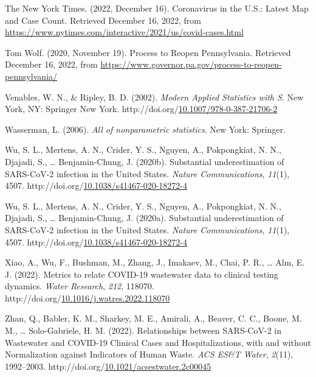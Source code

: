 \documentclass[12pt,twoside]{smiththesis}
\newlength{\cslhangindent}
\newenvironment{CSLReferences}[2] %
 {%
\setlength{\parindent}{0pt}
\ifodd #1 \everypar{\setlength{\hangindent}{\cslhangindent}}\ignorespaces\fi
\ifnum #2 > 0
\setlength{\parskip}{#2\baselineskip}
  \fi
}%
{}
\begin{document}
\begin{CSLReferences}{1}{0}
\leavevmode{}%
The New York Times. (2022, December 16). Coronavirus in the {U}.{S}.: {Latest Map} and {Case Count}. Retrieved December 16, 2022, from \url{https://www.nytimes.com/interactive/2021/us/covid-cases.html}

\leavevmode{}%
Tom Wolf. (2020, November 19). Process to {Reopen Pennsylvania}. Retrieved December 16, 2022, from \url{https://www.governor.pa.gov/process-to-reopen-pennsylvania/}

\leavevmode{}%
Venables, W. N., \& Ripley, B. D. (2002). \emph{Modern {Applied Statistics} with {S}}. {New York, NY}: {Springer New York}. http://doi.org/\href{https://doi.org/10.1007/978-0-387-21706-2}{10.1007/978-0-387-21706-2}

\leavevmode{}%
Wasserman, L. (2006). \emph{All of nonparametric statistics}. {New York}: {Springer}.

\leavevmode{}%
Wu, S. L., Mertens, A. N., Crider, Y. S., Nguyen, A., Pokpongkiat, N. N., Djajadi, S., \ldots{} Benjamin-Chung, J. (2020b). Substantial underestimation of {SARS-CoV-2} infection in the {United States}. \emph{Nature Communications}, \emph{11}(1), 4507. http://doi.org/\href{https://doi.org/10.1038/s41467-020-18272-4}{10.1038/s41467-020-18272-4}

\leavevmode{}%
Wu, S. L., Mertens, A. N., Crider, Y. S., Nguyen, A., Pokpongkiat, N. N., Djajadi, S., \ldots{} Benjamin-Chung, J. (2020a). Substantial underestimation of {SARS-CoV-2} infection in the {United States}. \emph{Nature Communications}, \emph{11}(1), 4507. http://doi.org/\href{https://doi.org/10.1038/s41467-020-18272-4}{10.1038/s41467-020-18272-4}

\leavevmode{}%
Xiao, A., Wu, F., Bushman, M., Zhang, J., Imakaev, M., Chai, P. R., \ldots{} Alm, E. J. (2022). Metrics to relate {COVID-19} wastewater data to clinical testing dynamics. \emph{Water Research}, \emph{212}, 118070. http://doi.org/\href{https://doi.org/10.1016/j.watres.2022.118070}{10.1016/j.watres.2022.118070}

\leavevmode{}%
Zhan, Q., Babler, K. M., Sharkey, M. E., Amirali, A., Beaver, C. C., Boone, M. M., \ldots{} Solo-Gabriele, H. M. (2022). Relationships between {SARS-CoV-2} in {Wastewater} and {COVID-19 Clinical Cases} and {Hospitalizations}, with and without {Normalization} against {Indicators} of {Human Waste}. \emph{ACS ES\&T Water}, \emph{2}(11), 1992--2003. http://doi.org/\href{https://doi.org/10.1021/acsestwater.2c00045}{10.1021/acsestwater.2c00045}

\end{CSLReferences}

\end{document}
